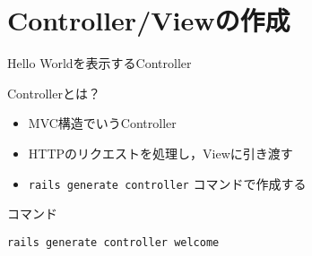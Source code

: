 \documentclass[t, aspectratio=169]{beamer}
\begin{document}
\section{Controller/Viewの作成}
\label{sec-6-2}
\begin{frame}[fragile,label=sec-6-2-1]{Hello Worldを表示するController}
 \begin{block}{Controllerとは？}
\begin{itemize}
\item MVC構造でいうController
\item HTTPのリクエストを処理し，Viewに引き渡す
\item \texttt{rails generate controller} コマンドで作成する
\end{itemize}
\end{block}

\begin{block}{コマンド}
\begin{verbatim}
rails generate controller welcome
\end{verbatim}
\end{block}
\end{frame}
\end{document}
